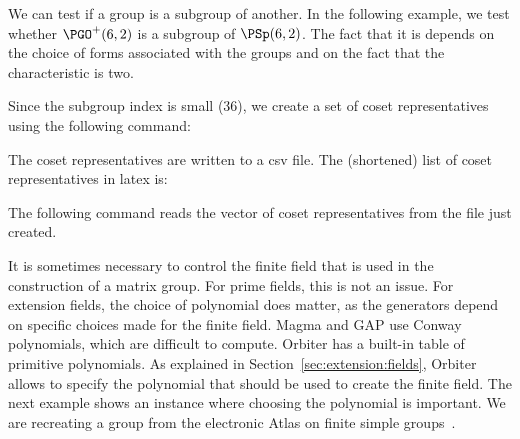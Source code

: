 \bigskip


We can test if a group is a subgroup of another. 
In the following example, we test whether 
$\PGO^+(6,2)$ is a subgroup of $\PSp(6,2)$. 
The fact that it is depends on the choice of forms 
associated with the groups and on the fact that the characteristic is two.
{\tt

}
Since the subgroup index is small (36), we create a set of 
coset representatives using the following command:
{\tt

}
The coset representatives are written to a csv file.
The (shortened) list of coset representatives in latex is:
\begin{mdframed}[style=MyFrame]

\end{mdframed}

\bigskip


The following command reads the vector of coset representatives from the file just created.
{\tt

}


It is sometimes necessary to control the finite field 
that is used in the construction of a matrix group.
For prime fields, this is not an issue. 
For extension fields, the choice of polynomial does matter, as 
the generators depend on specific choices made for the finite field. 
Magma and GAP use Conway polynomials, which are difficult to compute.
Orbiter has a built-in table of primitive polynomials. 
As explained in Section~\ref{sec:extension:fields},
Orbiter allows to specify the polynomial that should be used to create the finite field.
The next example shows an instance where choosing 
the polynomial is important. We are recreating a group 
from the electronic Atlas on finite simple groups~\cite{Atlas3}.

\bigskip

